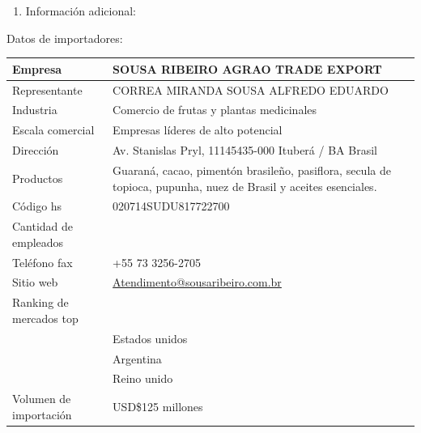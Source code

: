 \documentclass[
  stu,
  floatsintext,
  longtable,
  a4paper,
  nolmodern,
  notxfonts,
  notimes,
  colorlinks=true,linkcolor=blue,citecolor=blue,urlcolor=blue]{apa7}
\providecommand{\tightlist}{%
  \setlength{\itemsep}{0pt}\setlength{\parskip}{0pt}}
\begin{document}
\begin{enumerate}
\def\labelenumi{\arabic{enumi}.}
\setcounter{enumi}{10}
\tightlist
\item
  Información adicional:
\end{enumerate}

Datos de importadores:

\begin{longtable}[]{@{}
  >{\raggedright\arraybackslash}p{}
  >{\raggedright\arraybackslash}p{}@{}}
\toprule\noalign{}
\begin{minipage}[b]{\linewidth}\raggedright
\textbf{Empresa}
\end{minipage} & \begin{minipage}[b]{\linewidth}\raggedright
\textbf{SOUSA RIBEIRO AGRAO TRADE EXPORT}
\end{minipage} \\
\midrule\noalign{}
\endhead
\bottomrule\noalign{}
\endlastfoot
Representante & CORREA MIRANDA SOUSA ALFREDO EDUARDO \\
Industria & Comercio de frutas y plantas medicinales \\
Escala comercial & Empresas líderes de alto potencial \\
Dirección & Av. Stanislas Pryl, 11145435-000 Ituberá / BA Brasil \\
Productos & Guaraná, cacao, pimentón brasileño, pasiflora, secula de
topioca, pupunha, nuez de Brasil y aceites esenciales. \\
Código hs & 020714SUDU817722700 \\
Cantidad de empleados & 1001 \\
Teléfono fax & +55 73 3256-2705 \\
Sitio web &
\href{mailto:atendimento@sousaribeiro.com.br}{Atendimento@sousaribeiro.com.br} \\
Ranking de mercados top & \\
& Estados unidos \\
& Argentina \\
& Reino unido \\
Volumen de importación & USD\$125 millones \\
\end{longtable}
\end{document}

